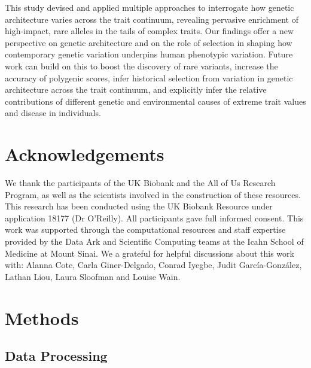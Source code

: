 \documentclass[12pt]{zHenriquesLab-StyleBioRxiv}
\begin{document}
This study devised and applied multiple approaches to interrogate how genetic architecture 
varies across the trait continuum, revealing pervasive enrichment of high-impact, 
rare alleles in the tails of complex traits. Our findings offer a new perspective on 
genetic architecture and on the role of selection in shaping how contemporary genetic 
variation underpins human phenotypic variation. Future work can build on this to boost 
the discovery of rare variants, increase the accuracy of polygenic scores, infer historical 
selection from variation in genetic architecture across the trait continuum, 
and explicitly infer the relative contributions of different genetic and environmental 
causes of extreme trait values and disease in individuals.
%
%
%
%
%
%
%
%
%
%
%
%
%
%
%
%
%
%
%
%
%
%
%
%
%
%
%
%
%
%
%
%
%
%
%
%
%
%
%
%
%
%
%
%
\section*{Acknowledgements}
We thank the participants of the UK Biobank and the All of Us Research Program, as well as the scientists involved in
the construction of these resources. This research has been conducted using
the UK Biobank Resource under application 18177 (Dr O’Reilly). All participants gave full informed consent. This work was supported through the computational resources and staff expertise provided by the Data Ark and Scientific Computing teams at
the Icahn School of Medicine at Mount Sinai. We a grateful for helpful discussions about this work with: Alanna Cote, Carla Giner-Delgado, Conrad Iyegbe, Judit García-González, Lathan Liou, Laura Sloofman and Louise Wain. 


\clearpage \newpage 
\section*{Methods} \label{sec:methods} 
\subsection*{Data Processing} \label{sec:methods:dataProcessing}
\end{document}
